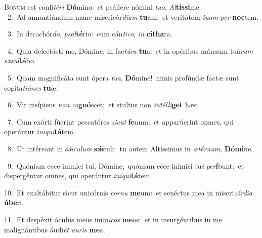 \lettrine{\initial\textcolor{\initialcolor}{B}}{onum} est confi\-\textit{té}\-\textit{ri} \textbf{Dó}\-mino:~\star et psállere nómini \textit{tu}\-\textit{o}, \textit{Al}\-\textbf{tís}\textbf{si}me.\\
{\numbfont\textcolor{\numbcolor}{~2.}}~Ad annuntiándum mane misericór\-\textit{di}\-\textit{am} \textbf{tu}\-am:~\star et veritátem \textit{tu}\-\textit{am} \textit{per} \textbf{noc}\-tem.\par
{\numbfont\textcolor{\numbcolor}{~3.}}~In decachór\-\textit{do}\-, \textit{psal}\-\textbf{té}rio:~\star cum cán\-\textit{ti}\-\textit{co}, \textit{in} \textbf{cí}\-\textbf{tha}ra.\par
{\numbfont\textcolor{\numbcolor}{~4.}}~Quia delectásti me, Dómine, in fac\-\textit{tú}\-\textit{ra} \textbf{tu}\-a:~\star et in opéribus mánuum tuá\textit{rum} \textit{ex}\-\textit{sul}\textbf{tá}bo.\par
{\numbfont\textcolor{\numbcolor}{~5.}}~Quam magnificáta sunt ópera \textit{tu}\-\textit{a}, \textbf{Dó}\-mine!~\star nimis profúndæ factæ sunt cogita\-\textit{ti}\-\textit{ó}\textit{nes} \textbf{tu}\-æ.\par
{\numbfont\textcolor{\numbcolor}{~6.}}~Vir insípiens \textit{non} \textit{co}\-\textbf{gnó}scet:~\star et stultus non \textit{in}\-\textit{tél}\textit{li}\textbf{get} hæc.\par
{\numbfont\textcolor{\numbcolor}{~7.}}~Cum exórti fúerint peccatóres \textit{sic}\-\textit{ut} \textbf{fe}\-num:~\star et apparúerint omnes, qui operántur \textit{in}\-\textit{i}\textit{qui}\textbf{tá}tem.\par
{\numbfont\textcolor{\numbcolor}{~8.}}~Ut intéreant in sǽ\-\textit{cu}\-\textit{lum} \textbf{sǽ}\-culi:~\star tu autem Altíssimus in \textit{æ}\-\textit{tér}\textit{num}, \textbf{Dó}\-\textbf{mi}ne.\par
{\numbfont\textcolor{\numbcolor}{~9.}}~Quóniam ecce inimíci tui, Dómine,~\dagger quóniam ecce inimíci tu\textit{i} \textit{per}\-\textbf{í}bunt:~\star et dispergéntur omnes, qui operántur \textit{in}\-\textit{i}\textit{qui}\textbf{tá}tem.\par
{\numbfont\textcolor{\numbcolor}{10.}}~Et exaltábitur sicut unicórnis \textit{cor}\-\textit{nu} \textbf{me}\-um:~\star et senéctus mea in miseri\-\textit{cór}\-\textit{di}\textit{a} \textbf{ú}\-\textbf{be}ri.\par
{\numbfont\textcolor{\numbcolor}{11.}}~Et despéxit óculus meus ini\-\textit{mí}\-\textit{cos} \textbf{me}\-os:~\star et in insurgéntibus in me malignántibus áudi\textit{et} \textit{au}\-\textit{ris} \textbf{me}\-a.\par

